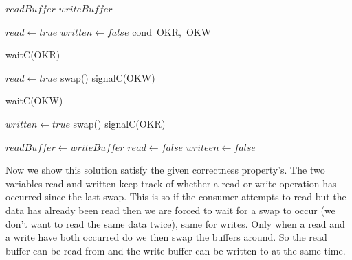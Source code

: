 \documentclass[a4paper, 12pt]{article}
\begin{document}
		\begin{algorithm}[H]
			\begin{algorithmic}[1]
				\State $readBuffer$
				\State $writeBuffer$			
			
					\State $read \gets true$
					\State $written \gets false$
					\State cond\ OKR,\ OKW
				\EndProcedure
				
						waitC(OKR)
					\EndIf
				\EndProcedure
				
					\State $read \gets true$
						\State swap()
						\State signalC(OKW)
					\EndIf
				\EndProcedure
				
						\State waitC(OKW)		
					\EndIf
				\EndProcedure
				
					\State $written \gets true$
						\State swap()
						\State signalC(OKR)
					\EndIf
				\EndProcedure
				
					\State $readBuffer \gets writeBuffer$
					\State $read \gets false$
					\State $writeen \gets false$
				\EndProcedure
			\end{algorithmic}
		\end{algorithm}
		
		Now we show this solution satisfy the given correctness property's. The two variables read and written keep track of whether a read or write operation has occurred since the last swap. This is so if the consumer attempts to read but the data has already been read then we are forced to wait for a swap to occur (we don't want to read the same data twice), same for writes. Only when a read and a write have both occurred do we then swap the buffers around. So the read buffer can be read from and the write buffer can be written to at the same time.
		
		
\end{document}
